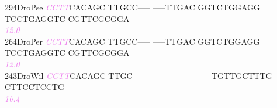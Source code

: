 \documentclass[11pt,twoside,reqno,a4paper]{article}
\begin{document}
{294\hspace*{1\charwidth}DroPse	\textit{\textcolor{violet}{C}}\textit{\textcolor{violet}{C}}\textit{\textcolor{violet}{T}}\textit{\textcolor{violet}{T}}CACAGC	TTGCC-----	-----TTGAC	GGTCTGGAGG	TCCTGAGGTC	CGTTCGCGGA	\\
\hspace*{4\charwidth}\hspace*{7\charwidth}\hspace*{0\charwidth}\textit{\textcolor{violet}{12.0}}\hspace*{1\charwidth}\hspace*{1\charwidth}\hspace*{1\charwidth}\hspace*{1\charwidth}\hspace*{1\charwidth}\hspace*{1\charwidth}\\
264\hspace*{1\charwidth}DroPer	\textit{\textcolor{violet}{C}}\textit{\textcolor{violet}{C}}\textit{\textcolor{violet}{T}}\textit{\textcolor{violet}{T}}CACAGC	TTGCC-----	-----TTGAC	GGTCTGGAGG	TCCTGAGGTC	CGTTCGCGGA	\\
\hspace*{4\charwidth}\hspace*{7\charwidth}\hspace*{0\charwidth}\textit{\textcolor{violet}{12.0}}\hspace*{1\charwidth}\hspace*{1\charwidth}\hspace*{1\charwidth}\hspace*{1\charwidth}\hspace*{1\charwidth}\hspace*{1\charwidth}\\
243\hspace*{1\charwidth}DroWil	\textit{\textcolor{violet}{C}}\textit{\textcolor{violet}{C}}\textit{\textcolor{violet}{T}}\textit{\textcolor{violet}{T}}CACAGC	TTGC------	----------	----------	TGTTGCTTTG	CTTCCTCCTG	\\
\hspace*{4\charwidth}\hspace*{7\charwidth}\hspace*{0\charwidth}\textit{\textcolor{violet}{10.4}}\hspace*{1\charwidth}\hspace*{1\charwidth}\hspace*{1\charwidth}\hspace*{1\charwidth}\hspace*{1\charwidth}\hspace*{1\charwidth}\\
}
\end{document}
